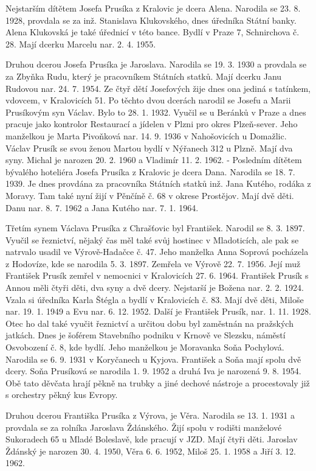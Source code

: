 \documentclass[../dejiny-rodu-prusiku.tex]{subfiles}
\begin{document}
Nejstarším dítětem Josefa Prusíka z Kralovic je dcera Alena. Narodila se 23. 8. 1928, provdala se za inž. Sta­nislava Klukovského, dnes úředníka Státní banky. Alena Klukovská je také úřednicí v této bance. Bydlí v Praze 7, Schnirchova č. 28. Mají dcerku Marcelu nar. 2. 4. 1955.

Druhou dcerou Josefa Prusíka je Jaroslava. Narodila se 19. 3. 1930 a provdala se za Zbyňka Rudu, který je pracovníkem Státních statků. Mají dcerku Janu Rudovou nar. 24. 7. 1954. Ze čtyř dětí Josefových žije dnes ona jediná s tatínkem, vdovcem, v Kralovicích 51. Po těchto dvou dcerách narodil se Josefu a Marii Prusíkovým syn Václav. Bylo to 28. 1. 1932. Vyučil se u Beránků v Praze a dnes pracuje jako kontrolor Restaurací a jídelen v Plzni pro okres Plzeň-sever. Jeho manželkou je Marta Pivoňková nar. 14. 9. 1936 v Nahošovicích u Domažlic. Václav Prusík se svou ženou Martou bydlí v Nýřanech 312 u Plzně. Mají dva syny. Michal je narozen 20. 2. 1960 a Vladimír 11. 2. 1962. - Posledním dítětem bývalého hoteliéra Josefa Prusíka z Kralovic je dcera Dana. Narodila se 18. 7. 1939. Je dnes provdána za pracovníka Stát­ních statků inž. Jana Kutého, rodáka z Moravy. Tam také nyní žijí v Pěnčíně č. 68 v okrese Prostějov. Mají dvě děti. Danu nar. 8. 7. 1962 a Jana Kutého nar. 7. 1. 1964.

Třetím synem Václava Prusíka z Chrašťovic byl František. Narodil se 8. 3. 1897. Vyučil se řeznictví, nějaký čas měl také svůj hostinec v Mladoticích, ale pak se natrvalo usadil ve Výrově-Hadačce č. 47. Jeho manželka Anna Soprová pocházela z Hodovíze, kde se narodila 5. 3. 1897. Zemřela ve Výrově 22. 7. 1956. Její muž František Prusík zemřel v nemocnici v Kralovicích 27. 6. 1964. František Prusík s Annou měli čtyři děti, dva syny a dvě dcery. Nejstarší je Božena nar. 2. 2. 1924. Vzala si úředníka Karla Štégla a bydlí v Kralovicích č. 83. Mají dvě děti, Miloše nar. 19. 1. 1949 a Evu nar. 6. 12. 1952. Další je František Prusík, nar. 1. 11. 1928. Otec ho dal také vyučit řeznictví a určitou dobu byl zaměstnán na pražských jatkách. Dnes je šoférem Stavebního podniku v Krnově ve Slezsku, náměstí Osvobození č. 8, kde bydlí. Jeho manželkou je Moravanka Soňa Pochylová. Narodila se 6. 9. 1931 v Koryčanech u Kyjova. František a Soňa ma­jí spolu dvě dcery. Soňa Prusíková se narodila 1. 9. 1952 a druhá Iva je narozená 9. 8. 1954. Obě tato děvčata hra­jí pěkně na trubky a jiné dechové nástroje a procesto­valy již s orchestry pěkný kus Evropy.

Druhou dcerou Františka Prusíka z Výrova, je Věra. Narodila se 13. 1. 1931 a provdala se za rolníka Jarosla­va Ždánského. Žijí spolu v rodišti manželové Sukoradech 65 u Mladé Boleslavě, kde pracují v JZD. Mají čtyři děti. Jaroslav Ždánský je narozen 30. 4. 1950, Věra 6. 6. 1952, Miloš 25. 1. 1958 a Jiří 3. 12. 1962.
\end{document}
